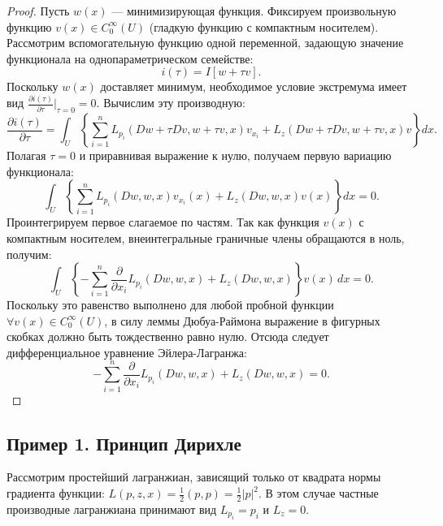 \begin{proof}
    Пусть $w(x)$ --- минимизирующая функция. Фиксируем произвольную функцию $v(x) \in C_0^\infty(U)$ (гладкую функцию с компактным носителем).
    Рассмотрим вспомогательную функцию одной переменной,
    задающую значение функционала на однопараметрическом семействе:
    \begin{equation}
        i(\tau) = I[w + \tau v].
    \end{equation}
    Поскольку $w(x)$ доставляет минимум, необходимое условие экстремума
    имеет вид $\frac{\partial i(\tau)}{\partial \tau} \big|_{\tau = 0} = 0$.
    Вычислим эту производную:
    \begin{equation}
        \frac{\partial i(\tau)}{\partial \tau} = \int_U \left\{ \sum_{i=1}^n L_{p_i}(Dw + \tau Dv, w + \tau v, x) v_{x_i} + L_z(Dw + \tau Dv, w + \tau v, x) v \right\} dx.
    \end{equation}
    Полагая $\tau = 0$ и приравнивая выражение к нулю, 
    получаем первую вариацию функционала:
    \begin{equation}
        \int_U \left\{ \sum_{i=1}^n L_{p_i}(Dw, w, x) v_{x_i}(x) + L_z(Dw, w, x) v(x) \right\} dx = 0.
    \end{equation}
    Проинтегрируем первое слагаемое по частям. 
    Так как функция $v(x)$ с компактным носителем, 
    внеинтегральные граничные члены обращаются в ноль, получим:
    \begin{equation}
        \int_U \left\{ - \sum_{i=1}^n \frac{\partial}{\partial x_i} L_{p_i}(Dw, w, x) + L_z(Dw, w, x) \right\} v(x) \, dx = 0.
    \end{equation}
    Поскольку это равенство выполнено для любой пробной функции 
    $\forall v(x) \in C_0^\infty(U)$, в силу леммы Дюбуа-Раймона выражение в
    фигурных скобках должно быть тождественно равно нулю.
    Отсюда следует дифференциальное уравнение Эйлера-Лагранжа:
    \begin{equation}
        - \sum_{i=1}^n \frac{\partial}{\partial x_i} L_{p_i} (Dw, w, x) + L_z(Dw, w, x) = 0.
    \end{equation}
\end{proof}

\subsection{Пример 1. Принцип Дирихле}
Рассмотрим простейший лагранжиан, зависящий только от квадрата нормы градиента 
функции: $L(p,z,x) = \frac{1}{2}(p,p) = \frac{1}{2}|p|^2$. В этом случае 
частные производные лагранжиана принимают вид $L_{p_i} = p_i$ и $L_z = 0$.

